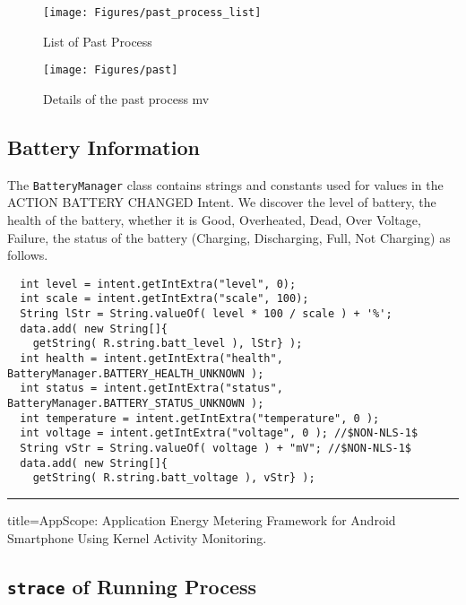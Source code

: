 \begin{figure}[hb]\centering
  \begin{minipage}{0.24\textwidth}
    \texttt{[image: Figures/past\_process\_list]}
    \caption{List of Past Process}
    \label{pastprocess}
  \end{minipage}\hfill
  \begin{minipage}{0.24\textwidth}
    \texttt{[image: Figures/past]}
    \caption{Details of the past process mv}
    \label{pastprocess}
  \end{minipage}
\end{figure}

\subsection{Battery Information}\label{seBattery}

The {\tt BatteryManager} class contains strings and constants used for
values in the ACTION BATTERY CHANGED Intent.  We discover the level of
battery, the health of the battery, whether it is Good, Overheated,
Dead, Over Voltage, Failure, the status of the battery (Charging,
Discharging, Full, Not Charging) as follows.

{\small
\begin{lstlisting}
  int level = intent.getIntExtra("level", 0); 
  int scale = intent.getIntExtra("scale", 100); 
  String lStr = String.valueOf( level * 100 / scale ) + '%';
  data.add( new String[]{
    getString( R.string.batt_level ), lStr} );
  int health = intent.getIntExtra("health", BatteryManager.BATTERY_HEALTH_UNKNOWN );
  int status = intent.getIntExtra("status", BatteryManager.BATTERY_STATUS_UNKNOWN );
  int temperature = intent.getIntExtra("temperature", 0 ); 
  int voltage = intent.getIntExtra("voltage", 0 ); //$NON-NLS-1$
  String vStr = String.valueOf( voltage ) + "mV"; //$NON-NLS-1$
  data.add( new String[]{
    getString( R.string.batt_voltage ), vStr} );
\end{lstlisting}}

\hrule

title={{AppScope}: Application Energy Metering Framework for Android
  Smartphone Using Kernel Activity Monitoring.}
\citep{yoon2012appscope}

\subsection{{\tt strace} of Running Process}

